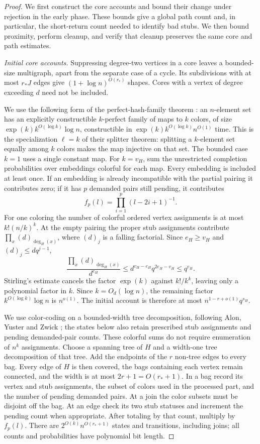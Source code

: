 \begin{proof}
We first construct the core accounts and bound their change under
rejection in the early phase. These bounds give a global path count and,
in particular, the short-return count needed to identify bad stubs. We
then bound proximity, perform cleanup, and verify that cleanup preserves
the same core and path estimates.

\emph{Initial core accounts.}
Suppressing degree-two vertices in a core leaves a bounded-size
multigraph, apart from the separate case of a cycle. Its subdivisions
with at most $r_*J$ edges give $(1+\log n)^{O(r_*)}$ shapes. Cores with
a vertex of degree exceeding $d$ need not be included.

We use the following form of the perfect-hash-family theorem
\cite[Section~4.4, Theorem~3(iii)]{NSS1995}: an $n$-element set has an explicitly
constructible
$k$-perfect family of maps to $k$ colors, of size
$\exp(k) k^{O(\log k)}\log n$, constructible in
$\exp(k) k^{O(\log k)}n^{O(1)}$ time. This is the specialization
$\ell=k$ of their splitter theorem: splitting a $k$-element set
equally among $k$ colors makes the map injective on that set.
The bounded case $k=1$ uses a single constant map.
For $k=v_H$, sum the unrestricted
completion probabilities over embeddings colorful for each map.
Every embedding is included at least once. If an embedding is already
incompatible with the partial pairing it contributes zero; if it has
$p$ demanded pairs still pending, it contributes
\[
 f_p(l)=\prod_{i=1}^p(l-2i+1)^{-1}.
\]
For one coloring the number of colorful ordered vertex assignments is
at most $k!(n/k)^k$. At the empty pairing the proper stub assignments
contribute $\prod_x(d)_{\deg_H(x)}$, where $(d)_j$ is a falling
factorial. Since $e_H\ge v_H$ and $(d)_j\le dq^{j-1}$,
\[
 \frac{\prod_x(d)_{\deg_H(x)}}{d^{e_H}}
 \le d^{v_H-e_H}q^{2e_H-v_H}\le q^{e_H}.
\]
Stirling's estimate cancels the factor $\exp(k)$ against $k!/k^k$,
leaving only a polynomial factor in $k$. Since $k=O_d(\log n)$,
the remaining factor $k^{O(\log k)}\log n$ is $n^{o(1)}$.
The initial account is therefore at most
$n^{1-r+o(1)}q^{s_H}$.

We use color-coding on a bounded-width tree decomposition, following
Alon, Yuster and Zwick \cite[Section~6, Theorem~6.3]{AYZ1995}; the states below also retain
prescribed stub assignments and pending demanded-pair counts. These
colorful sums do not require enumeration of
$n^k$ assignments. Choose a spanning tree of $H$ and a width-one
tree decomposition of that tree. Add the endpoints of the $r$
non-tree edges to every bag. Every edge of $H$ is then covered,
the bags containing each vertex remain connected, and the width
is at most $2r+1=O(r_*+1)$. In a bag record its vertex and stub
assignments, the subset of colors used in the processed part, and the
number of pending demanded pairs. At a join the color subsets must be
disjoint off the bag. At an edge check its two stub statuses and
increment the pending count when appropriate. After totaling by that
count, multiply by $f_p(l)$. There are
$2^{O(k)}n^{O(r_*+1)}$ states and transitions, including joins; all
counts and probabilities have polynomial bit length.


\end{proof}
